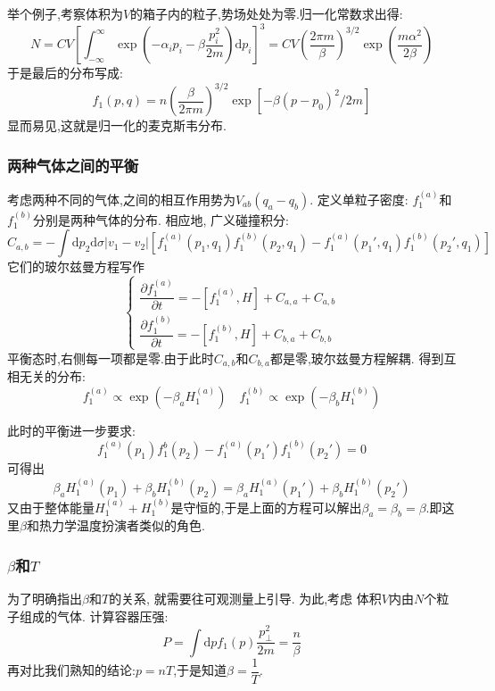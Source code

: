     举个例子,考察体积为$V$的箱子内的粒子,势场处处为零.归一化常数求出得:
    \[N=CV\left[ \int_{-\infty}^{\infty} \exp(-\alpha_{i}p_{i}-\beta\frac{p_{i}^{2}}{2m}) \mathrm{d}p_{i} \right] ^{3}=CV\left( \frac{2\pi m}{\beta} \right) ^{3 /2} \exp(\frac{m\alpha^{2}}{2\beta})\]
    于是最后的分布写成:
    \[f_1(p,q)=n\left( \frac{\beta}{2\pi m} \right) ^{3 /2}\exp\left[ -\beta(p-p_0)^{2}/2m \right] \]
    显而易见,这就是归一化的麦克斯韦分布.

\subsubsection*{两种气体之间的平衡}
    考虑两种不同的气体,之间的相互作用势为$V_{ab}(q_{a}-q_{b})$. 定义单粒子密度: $f_{1}^{(a)}$和$f_1^{(b)}$分别是两种气体的分布. 相应地, 广义碰撞积分:
    \[C_{a,b}=-\int \mathrm{d} p_2 \mathrm{d}  \sigma \left\vert v_1-v_2 \right\vert \left[ f_1^{(a)}(p_1,q_1)f_1^{(b)}(p_2,q_1)-f_1^{(a)}(p_1',q_1)f_1^{(b)}(p_2',q_1) \right] \]
    它们的玻尔兹曼方程写作
    \begin{equation}
      \left\{  
      \begin{matrix}
      \dfrac{\partial f_1^{(a)}}{\partial t}=-[f_1^{(a)},H]+C_{a,a}+C_{a,b} \\
      \dfrac{\partial f_1^{(b)}}{\partial t}=-[f_1^{(b)},H]+C_{b,a}+C_{b,b} 
      \end{matrix}
      \right.
    \end{equation}
    平衡态时,右侧每一项都是零.由于此时$C_{a,b}$和$C_{b,a}$都是零,玻尔兹曼方程解耦. 得到互相无关的分布:
    \[f_1^{(a)} \propto \exp(-\beta_{a} H_{1}^{(a)}) \quad f_1^{(b)} \propto \exp(-\beta_{b} H_1^{(b)})\]
    
    此时的平衡进一步要求:
    \begin{equation}
      f_1^{(a)}(p_1)f_1^{b}(p_2)-f_1^{(a)}(p_1')f_1^{(b)}(p_2')=0
    \end{equation}
    可得出
    \[\beta_{a}H_1^{(a)}(p_1)+\beta_{b}H_1^{(b)}(p_2)=\beta_{a}H_1^{(a)}(p_1')+\beta_{b}H_1^{(b)}(p_2')\]
    又由于整体能量$H_1^{(a)}+H_1^{(b)}$是守恒的,于是上面的方程可以解出$\beta_{a}=\beta_{b}=\beta$.即这里$\beta$和热力学温度扮演者类似的角色.

\subsubsection*{$\beta$和$T$}
    为了明确指出$\beta$和$T$的关系, 就需要往可观测量上引导. 为此,考虑 体积$V$内由$N$个粒子组成的气体. 计算容器压强:
    \[P=\int \mathrm{d} p f_1(p) \frac{p_{\bot}^{2}}{2m}=\frac{n}{\beta}\]
    再对比我们熟知的结论:$p=nT$,于是知道$\beta=\dfrac{1}{T}$.

